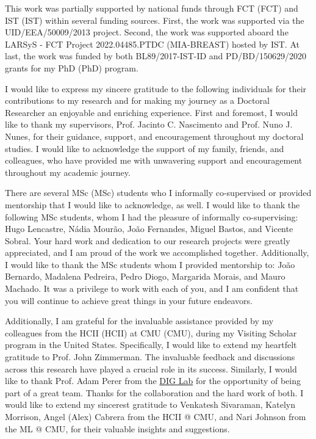 
This work was partially supported by national funds through \acl{FCT} (\acs{FCT}) and \acl{IST} (\acs{IST}) within several funding sources.
First, the work was supported via the UID/EEA/50009/2013 project.
Second, the work was supported aboard the LARSyS - \acs{FCT} Project 2022.04485.PTDC (MIA-BREAST) hosted by \acs{IST}.
At last, the work was funded by both BL89/2017-\acs{IST}-ID and PD/BD/150629/2020 grants for my \acl{PhD} (\acs{PhD}) program.

I would like to express my sincere gratitude to the following individuals for their contributions to my research and for making my journey as a Doctoral Researcher an enjoyable and enriching experience.
First and foremost, I would like to thank my supervisors, Prof. Jacinto C. Nascimento and Prof. Nuno J. Nunes, for their guidance, support, and encouragement throughout my doctoral studies.
I would like to acknowledge the support of my family, friends, and colleagues, who have provided me with unwavering support and encouragement throughout my academic journey.

There are several \acl{MSc} (\acs{MSc}) students who I informally co-supervised or provided mentorship that I would like to acknowledge, as well.
I would like to thank the following \acs{MSc} students, whom I had the pleasure of informally co-supervising: Hugo Lencastre, N\'{a}dia Mour\~{a}o, Jo\~{a}o Fernandes, Miguel Bastos, and Vicente Sobral.
Your hard work and dedication to our research projects were greatly appreciated, and I am proud of the work we accomplished together.
Additionally, I would like to thank the \acs{MSc} students whom I provided mentorship to: Jo\~{a}o Bernardo, Madalena Pedreira, Pedro Diogo, Margarida Morais, and Mauro Machado.
It was a privilege to work with each of you, and I am confident that you will continue to achieve great things in your future endeavors.

Additionally, I am grateful for the invaluable assistance provided by my colleagues from the \acl{HCII} (\acs{HCII}) at \acl{CMU} (\acs{CMU}), during my Visiting Scholar program in the United States.
Specifically, I would like to extend my heartfelt gratitude to Prof. John Zimmerman.
The invaluable feedback and discussions across this research have played a crucial role in its success.
Similarly, I would like to thank Prof. Adam Perer from the \href{https://dig.cmu.edu/}{DIG Lab} for the opportunity of being part of a great team.
Thanks for the collaboration and the hard work of both.
I would like to extend my sincerest gratitude to Venkatesh Sivaraman, Katelyn Morrison, Angel (Alex) Cabrera from the \acs{HCII} @ \acs{CMU}, and Nari Johnson from the \acs{ML} @ \acs{CMU}, for their valuable insights and suggestions.


